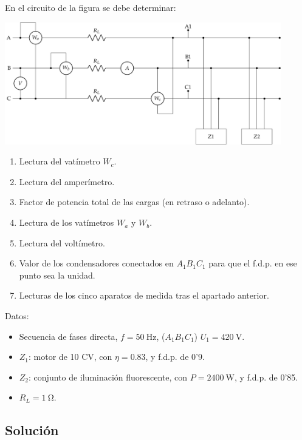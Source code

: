 En el circuito de la figura se debe determinar:

\begin{center}
  \includegraphics[width=0.9\textwidth]{figuras/BT3_11.pdf}
\end{center}

\begin{enumerate}
\item Lectura del vatímetro $W_c$.
\item Lectura del amperímetro.
\item Factor de potencia total de las cargas (en retraso o
  adelanto).
\item Lectura de los vatímetros $W_a$ y $W_b$.
\item Lectura del voltímetro.
\item Valor de los condensadores conectados en $A_1B_1C_1$ para
  que el f.d.p. en ese punto sea la unidad.
\item Lecturas de los cinco aparatos de medida tras el apartado
  anterior.
\end{enumerate}

Datos:
\begin{itemize}
\item Secuencia de fases directa, $f = \SI{50}{\hertz}$, ($A_1B_1C_1$)
  $U_1 = \SI{420}{\volt}$.
\item $Z_1$: motor de 10 CV, con $\eta = 0.83$, y f.d.p. de 0'9.
\item $Z_2$: conjunto de iluminación fluorescente, con
  $P = \SI{2400}{\watt}$, y f.d.p. de 0'85.
\item $R_L = \SI{1}{\ohm}$.
\end{itemize}

\subsection*{Solución}

